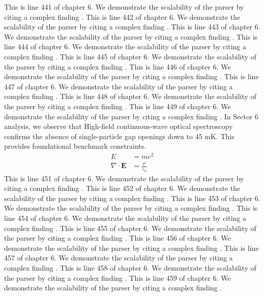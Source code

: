 This is line 441 of chapter 6. We demonstrate the scalability of the parser by citing a complex finding \cite{ref6_441}.
This is line 442 of chapter 6. We demonstrate the scalability of the parser by citing a complex finding \cite{ref6_442}.
This is line 443 of chapter 6. We demonstrate the scalability of the parser by citing a complex finding \cite{ref6_443}.
This is line 444 of chapter 6. We demonstrate the scalability of the parser by citing a complex finding \cite{ref6_444}.
This is line 445 of chapter 6. We demonstrate the scalability of the parser by citing a complex finding \cite{ref6_445}.
This is line 446 of chapter 6. We demonstrate the scalability of the parser by citing a complex finding \cite{ref6_446}.
This is line 447 of chapter 6. We demonstrate the scalability of the parser by citing a complex finding \cite{ref6_447}.
This is line 448 of chapter 6. We demonstrate the scalability of the parser by citing a complex finding \cite{ref6_448}.
This is line 449 of chapter 6. We demonstrate the scalability of the parser by citing a complex finding \cite{ref6_449}.
In Sector 6 analysis, we observe that High-field continuous-wave optical spectroscopy confirms the absence of single-particle gap openings down to 45 mK. This provides foundational benchmark constraints.
\begin{align*}
  E &= mc^2 \\
  \nabla \cdot \mathbf{E} &= \frac{\rho}{\varepsilon_0}
\end{align*}
This is line 451 of chapter 6. We demonstrate the scalability of the parser by citing a complex finding \cite{ref6_451}.
This is line 452 of chapter 6. We demonstrate the scalability of the parser by citing a complex finding \cite{ref6_452}.
This is line 453 of chapter 6. We demonstrate the scalability of the parser by citing a complex finding \cite{ref6_453}.
This is line 454 of chapter 6. We demonstrate the scalability of the parser by citing a complex finding \cite{ref6_454}.
This is line 455 of chapter 6. We demonstrate the scalability of the parser by citing a complex finding \cite{ref6_455}.
This is line 456 of chapter 6. We demonstrate the scalability of the parser by citing a complex finding \cite{ref6_456}.
This is line 457 of chapter 6. We demonstrate the scalability of the parser by citing a complex finding \cite{ref6_457}.
This is line 458 of chapter 6. We demonstrate the scalability of the parser by citing a complex finding \cite{ref6_458}.
This is line 459 of chapter 6. We demonstrate the scalability of the parser by citing a complex finding \cite{ref6_459}.
